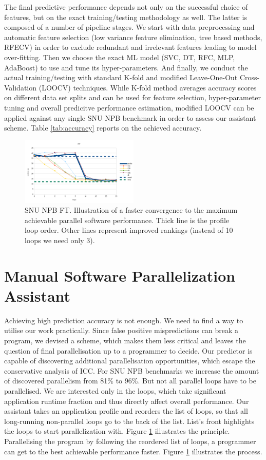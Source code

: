 \documentclass{acaces}
\begin{document}
\quad The final predictive performance depends not only on the successful choice of features, but on the exact training/testing methodology as well. The latter is composed of a number of pipeline stages. We start with data preprocessing and automatic feature selection (low variance feature elimination, tree based methods, RFECV) in order to exclude redundant and irrelevant features leading to model over-fitting. Then we choose the exact ML model (SVC, DT, RFC, MLP, AdaBoost) to use and tune its hyper-parameters. And finally, we conduct the actual training/testing with standard K-fold and modified Leave-One-Out Cross-Validation (LOOCV) techniques. While K-fold method averages accuracy scores on different data set splits and can be used for feature selection, hyper-parameter tuning and overall predicitve performance estimation, modified LOOCV can be applied against any single SNU NPB benchmark in order to assess our assistant scheme. Table \ref{tab:accuracy} reports on the achieved accuracy.
\begin{figure}
	\includegraphics[width=0.5\textwidth]{ft_parallelisation}
	\caption{SNU NPB FT. Illustration of a faster convergence to the maximum achievable parallel software performance. Thick line is the profile loop order. Other lines represent improved rankings (instead of 10 loops we need only 3).}
	\label{convergence}
\end{figure}\null
\section{Manual Software Parallelization Assistant}
\label{predicting_parallel_loops}
\quad Achieving high prediction accuracy is not enough. We need to find a way to utilise our work practically. Since false positive mispredictions can break a program, we devised a scheme, which makes them less critical and leaves the question of final parallelisation up to a programmer to decide.\newline\null
\quad Our predictor is capable of discovering additional parallelisation opportunities, which escape the conservative analysis of ICC. For SNU NPB benchmarks we increase the amount of discovered parallelism from 81\% to 96\%. But not all parallel loops have to be parallelised. We are interested only in the loops, which take significant application runtime fraction and thus directly affect overall performance. Our assistant takes an application profile and reorders the list of loops, so that all long-running non-parallel loops go to the back of the list. List's front highlights the loops to start parallelization with. Figure \ref{convergence} illustrates the principle. Parallelising the program by following the reordered list of loops, a programmer can get to the best achievable performance faster. Figure \ref{convergence} illustrates the process.   


\end{document}
